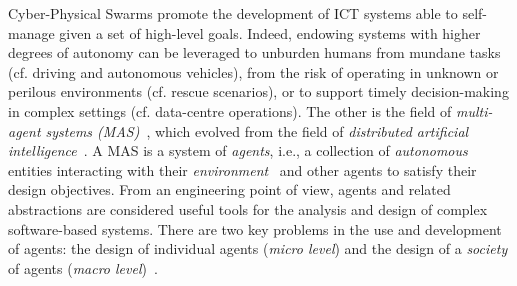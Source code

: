 





%
%
%
Cyber-Physical Swarms promote the development of ICT  systems
able to self-manage given a set of high-level goals.
%
Indeed, endowing systems with higher degrees of autonomy can be leveraged to
 unburden humans from mundane tasks (cf. driving and autonomous vehicles),
 from the risk of operating in unknown or perilous environments
 (cf. rescue scenarios),
 or to support timely decision-making in complex settings
 (cf. data-centre operations).
%
The other is the field of \emph{multi-agent systems (MAS)}~\cite{wooldridge2009mas}, which evolved from the field of \emph{distributed artificial intelligence}~\cite{ferber1999mas-dai}.
%
A MAS is a system of \emph{agents}, i.e., a collection of \emph{autonomous} entities interacting with their \emph{environment}~\cite{DBLP:journals/aamas/WeynsOO07} and other agents to satisfy their design objectives.
%
From an engineering point of view, agents and related abstractions are considered useful tools for the analysis
and design of complex software-based systems.
%
There are two key problems in the use and development of agents: the design of individual agents (\emph{micro level}) and the design of a \emph{society} of agents (\emph{macro level})~\cite{wooldridge2009mas}.

